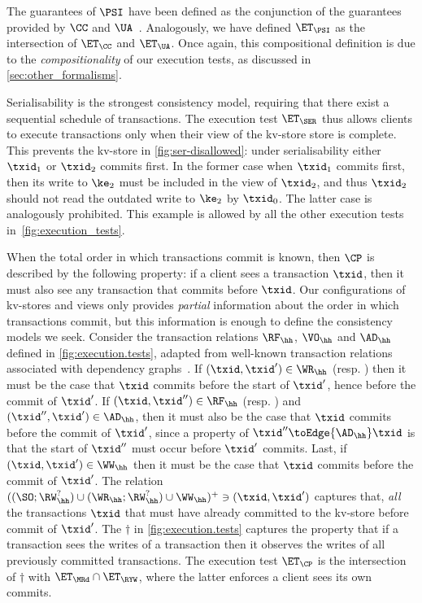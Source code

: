 The guarantees of $\PSI$ have been defined as the conjunction of the guarantees provided by $\CC$ and $\UA$~\cite{framework-concur}.
Analogously, we have defined $\ET_\PSI$ as the intersection of $\ET_\CC$ and $\ET_\UA$. 
Once again, this compositional definition is due to the \emph{compositionality} of our execution tests, as discussed in \cref{sec:other_formalisms}.

Serialisability is the strongest consistency model, requiring that there exist a sequential schedule of transactions. 
The execution test $\ET_{\SER}$ thus allows clients to execute transactions only when 
their view of the kv-store store is complete.
This prevents the kv-store in  \cref{fig:ser-disallowed}: under serialisability either $\txid_1$ or $\txid_2$ commits first.
In the former case when $\txid_1$ commits first, then its write to $\ke_2$ must be included in the view of $\txid_2$, and thus $\txid_2$ should not read the outdated write to $\ke_2$ by $\txid_0$. 
The latter case is analogously prohibited. 
This example is allowed by all the other execution tests in~\cref{fig:execution_tests}.

\label{para:cp}
When the total order in which transactions commit is known, then 
$\CP$ is described by the following property: 
if a client sees a transaction $\txid$,
then it must also see any transaction that commits before $\txid$. 
Our configurations of kv-stores and views only provides {\em
  partial} information about the order in which transactions commit,
but this information is enough to define the consistency models we
seek. 
Consider the transaction relations $\RF_{\hh}$, $\VO_{\hh}$ and
$\AD_{\hh}$ defined in \ref{fig:execution.tests}, adapted from well-known
transaction relations associated with dependency graphs~\cite{adya-icde,adya}. 
If $(\txid,\txid') \in \WR_\hh$ (resp. \SO) then it {must} be
the case that $\txid$ commits before the start of $\txid'$, hence before the commit of $\txid'$.
If $(\txid,\txid'') \in \RF_{\hh}$ (resp. \SO) and $(\txid'',\txid') \in \AD_\hh$, then it {must} also be the case that $\txid$ commits before the commit  of $\txid'$, since a property of
$\txid'' \toEdge{\AD_\hh} \txid$ is that the start of $\txid''$ must occur before $\txid'$ commits.
Last, if $(\txid,\txid') \in \WW_\hh$ then it {must} be
the case that $\txid$ commits before the commit of $\txid'$.
The relation $((\SO ; \RW_{\hh}^{?}) \cup (\WR_{\hh} ; \RW_{\hh}^{?}) \cup \WW_\hh )^{+} \ni (\txid, \txid')$
captures that, {\em all} the transactions $\txid$ that {must} have already committed to the kv-store before commit of \( \txid' \).
The $\dagger$ in \cref{fig:execution.tests} captures the property that if a transaction sees 
the writes of a transaction then it observes the writes of all previously committed
transactions. 
The execution test $\ET_{\CP}$ is the intersection of $\dagger$ with $\ET_\MRd \cap \ET_\RYW$,
where the latter enforces a client sees its own commits.


